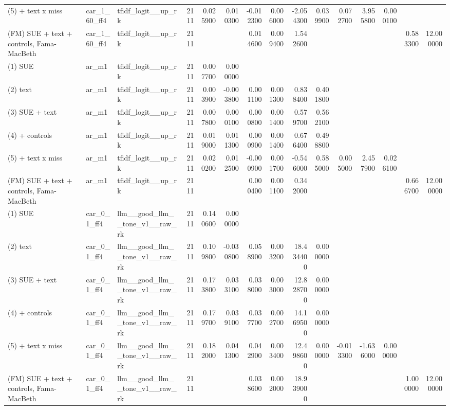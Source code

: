 \begin{table}
\begin{tabular}{lllrrrrrrrrrrrr}
(5) + text x miss & car\_1\_60\_ff4 & tfidf\_logit\_\_up\_rk & 2111 & 0.025900 & 0.010300 & -0.012300 & 0.006000 & -2.054300 & 0.039900 & 0.072700 & 3.955800 & 0.000100 &  &  \\
(FM) SUE + text + controls, Fama-MacBeth & car\_1\_60\_ff4 & tfidf\_logit\_\_up\_rk & 2111 &  &  & 0.014600 & 0.009400 & 1.542600 &  &  &  &  & 0.583300 & 12.000000 \\
(1) SUE & ar\_m1 & tfidf\_logit\_\_up\_rk & 2111 & 0.007700 & 0.000000 &  &  &  &  &  &  &  &  &  \\
(2) text & ar\_m1 & tfidf\_logit\_\_up\_rk & 2111 & 0.003900 & -0.003800 & 0.001100 & 0.001300 & 0.838400 & 0.401800 &  &  &  &  &  \\
(3) SUE + text & ar\_m1 & tfidf\_logit\_\_up\_rk & 2111 & 0.007800 & 0.000100 & 0.000800 & 0.001400 & 0.579700 & 0.562100 &  &  &  &  &  \\
(4) + controls & ar\_m1 & tfidf\_logit\_\_up\_rk & 2111 & 0.019000 & 0.011300 & 0.000900 & 0.001400 & 0.676400 & 0.498800 &  &  &  &  &  \\
(5) + text x miss & ar\_m1 & tfidf\_logit\_\_up\_rk & 2111 & 0.020200 & 0.012500 & -0.000900 & 0.001700 & -0.546000 & 0.585000 & 0.005000 & 2.457900 & 0.026100 &  &  \\
(FM) SUE + text + controls, Fama-MacBeth & ar\_m1 & tfidf\_logit\_\_up\_rk & 2111 &  &  & 0.000400 & 0.001100 & 0.342000 &  &  &  &  & 0.666700 & 12.000000 \\
(1) SUE & car\_0\_1\_ff4 & llm\_\_good\_llm\_\_tone\_v1\_\_raw\_rk & 2111 & 0.140600 & 0.000000 &  &  &  &  &  &  &  &  &  \\
(2) text & car\_0\_1\_ff4 & llm\_\_good\_llm\_\_tone\_v1\_\_raw\_rk & 2111 & 0.109800 & -0.030800 & 0.058900 & 0.003200 & 18.434400 & 0.000000 &  &  &  &  &  \\
(3) SUE + text & car\_0\_1\_ff4 & llm\_\_good\_llm\_\_tone\_v1\_\_raw\_rk & 2111 & 0.173800 & 0.033100 & 0.038000 & 0.003000 & 12.828700 & 0.000000 &  &  &  &  &  \\
(4) + controls & car\_0\_1\_ff4 & llm\_\_good\_llm\_\_tone\_v1\_\_raw\_rk & 2111 & 0.179700 & 0.039100 & 0.037700 & 0.002700 & 14.169500 & 0.000000 &  &  &  &  &  \\
(5) + text x miss & car\_0\_1\_ff4 & llm\_\_good\_llm\_\_tone\_v1\_\_raw\_rk & 2111 & 0.182000 & 0.041300 & 0.042900 & 0.003400 & 12.498600 & 0.000000 & -0.013300 & -1.636000 & 0.000000 &  &  \\
(FM) SUE + text + controls, Fama-MacBeth & car\_0\_1\_ff4 & llm\_\_good\_llm\_\_tone\_v1\_\_raw\_rk & 2111 &  &  & 0.038600 & 0.002000 & 18.939000 &  &  &  &  & 1.000000 & 12.000000 \\

\end{tabular}
\end{table}
